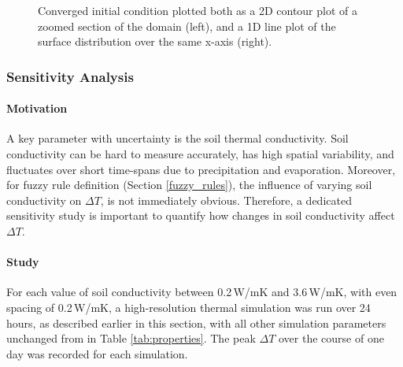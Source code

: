 \begin{figure}[htbp]
\begin{minipage}[b]{0.48\textwidth}
            \end{minipage}
            \caption[Converged initial condition]{Converged initial condition plotted both as a 2D contour plot of a zoomed section of the domain (left), and a 1D line plot of the surface distribution over the same x-axis (right).}
            \label{fig:combined_thermal} %
        \end{figure}
    
    
    \subsubsection{Sensitivity Analysis}
    
        \paragraph{Motivation}
            
            \noindent A key parameter with uncertainty is the soil thermal conductivity. Soil conductivity can be hard to measure accurately, has high spatial variability, and fluctuates over short time-spans due to precipitation and evaporation. Moreover, for fuzzy rule definition (Section \ref{fuzzy_rules}), the influence of varying soil conductivity on \(\Delta T\), is not immediately obvious. Therefore, a dedicated sensitivity study is important to quantify how changes in soil conductivity affect \(\Delta T\).
        
        \paragraph{Study}
        
            \noindent For each value of soil conductivity between 0.2\,W/mK and 3.6\,W/mK, with even spacing of 0.2\,W/mK, a high-resolution thermal simulation was run over 24 hours, as described earlier in this section, with all other simulation parameters unchanged from in Table \ref{tab:properties}. The peak \(\Delta T\) over the course of one day was recorded for each simulation.
            
